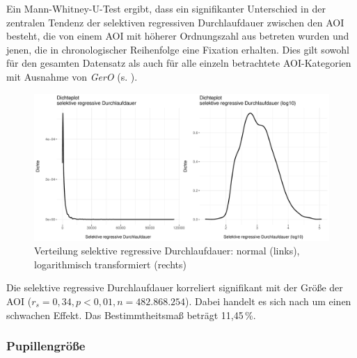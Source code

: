 Ein Mann-Whitney-U-Test ergibt, dass ein signifikanter Unterschied in der zentralen Tendenz der selektiven regressiven Durchlaufdauer zwischen den AOI besteht, die von einem AOI mit höherer Ordnungszahl aus betreten wurden und jenen, die in chronologischer Reihenfolge eine Fixation erhalten. Dies gilt sowohl für den gesamten Datensatz als auch für alle einzeln betrachtete AOI-Kategorien mit Ausnahme von \emph{GerO} (s. ).\largerpage[2]

\vfill
\begin{figure}[H]
	\centerline{\includegraphics[width=\textwidth]{Figures/EyeTracking/CatDe/ggplot_catde-select-RegPD_density_de}}
	\caption{Verteilung selektive regressive Durchlaufdauer: normal (links), logarithmisch transformiert (rechts)}
	\label{K6:fig:CatDe:density-iaselregpd}
\end{figure}
\vfill\pagebreak


Die selektive regressive Durchlaufdauer korreliert signifikant mit der Größe der AOI ($r_{s} = 0,34, p < 0,01, n = 482.868.254$). Dabei handelt es sich nach \citet{cohen_power_1992} um einen schwachen Effekt. Das Bestimmtheitsmaß beträgt 11,45\,\%.



\subsubsection{Pupillengröße}
\label{K6:subsubsec:psize:catde}

